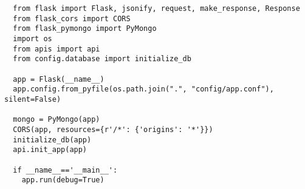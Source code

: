 \begin{code}
\label{code:apiInit}
\begin{verbatim}
  from flask import Flask, jsonify, request, make_response, Response
  from flask_cors import CORS
  from flask_pymongo import PyMongo
  import os
  from apis import api
  from config.database import initialize_db

  app = Flask(__name__)
  app.config.from_pyfile(os.path.join(".", "config/app.conf"), silent=False)

  mongo = PyMongo(app)
  CORS(app, resources={r'/*': {'origins': '*'}})
  initialize_db(app)
  api.init_app(app)

  if __name__=='__main__':
    app.run(debug=True)

\end{verbatim}
\end{code}
